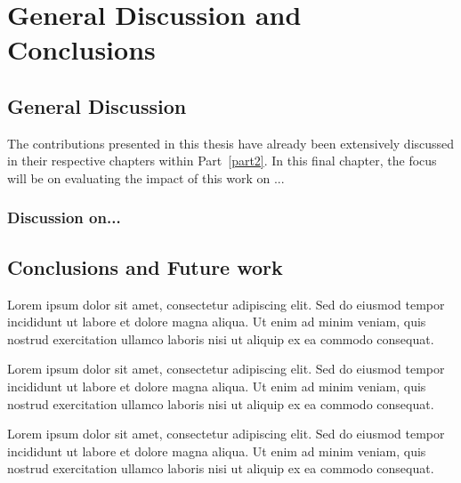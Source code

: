 

\chapter[General Discussion and Conclusions]{General Discussion and\\ Conclusions}\label{chap_09}
\minitoc

\section{General Discussion}

The contributions presented in this thesis have already been extensively discussed in their respective chapters within Part~\ref{part2}. In this final chapter, the focus will be on evaluating the impact of this work on ...

\subsection{Discussion on...}

\section{Conclusions and Future work}
Lorem ipsum dolor sit amet, consectetur adipiscing elit. Sed do eiusmod tempor incididunt ut labore et dolore magna aliqua. Ut enim ad minim veniam, quis nostrud exercitation ullamco laboris nisi ut aliquip ex ea commodo consequat.



Lorem ipsum dolor sit amet, consectetur adipiscing elit. Sed do eiusmod tempor incididunt ut labore et dolore magna aliqua. Ut enim ad minim veniam, quis nostrud exercitation ullamco laboris nisi ut aliquip ex ea commodo consequat.



Lorem ipsum dolor sit amet, consectetur adipiscing elit. Sed do eiusmod tempor incididunt ut labore et dolore magna aliqua. Ut enim ad minim veniam, quis nostrud exercitation ullamco laboris nisi ut aliquip ex ea commodo consequat.


